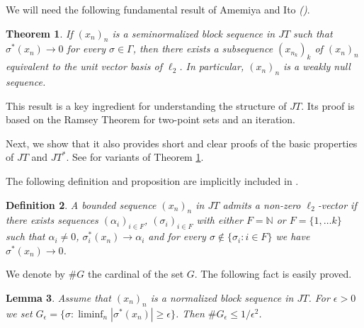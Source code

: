 \documentclass[12pt]{amsart}
\theoremstyle{plain}
\numberwithin{equation}{section}
\newcommand{\N}{\mathbb{N}}
\newtheorem{theorem}{Theorem}[section]
\newtheorem{lemma}[theorem]{Lemma}
\newtheorem{definition}[theorem]{Definition}
\begin{document}
We will need the following fundamental result of Amemiya and Ito \emph{(\cite[Theorem]{AI})}.

\begin{theorem}\label{A-I}
If $(x_n)_n$ is a seminormalized block sequence in $JT$ such that $\sigma^*(x_n) \to 0$ for every $\sigma \in \Gamma$, then there exists a subsequence $(x_{n_k})_k$ of $(x_n)_n$ equivalent to the unit vector basis of $\ell_2$. In particular, $(x_n)_n$ is a weakly null sequence.
\end{theorem}

This result is a key ingredient for understanding the structure of $JT$. Its proof is based on the Ramsey Theorem for two-point sets and an iteration.

Next, we show that it also provides short and clear proofs of the basic properties of $JT$ and $JT^*$. See \cite{AMM} for variants of Theorem \ref{A-I}.

The following definition and proposition are implicitly included in \cite{LS}.

\begin{definition}\label{D2}
A bounded sequence $(x_n)_n$ in $JT$ admits a non-zero $\ell_2$-vector if there exists sequences $(\alpha_i)_{i \in F}$, $(\sigma_i)_{i\in F}$ with either $F=\N$ or $F=\{1,\dots k\}$ such that $\alpha_i \neq 0$, $\sigma_i^*(x_n) \to \alpha_i$ and for every $\sigma \notin \{\sigma_i:i\in F\}$ we have $\sigma^*(x_n) \to 0$.
\end{definition}

We denote by $\#G$ the cardinal of the set $G$. The following fact is easily proved.

\begin{lemma}\label{L1}
Assume that $(x_n)_n$ is a normalized block sequence in $JT$. For $\epsilon > 0$ we set $G_{\epsilon} = \{ \sigma : \liminf_n |\sigma^*(x_n)| \geq \epsilon \}$.
Then $\#G_{\epsilon}\leq 1/\epsilon^2$.
\end{lemma}
\end{document}
